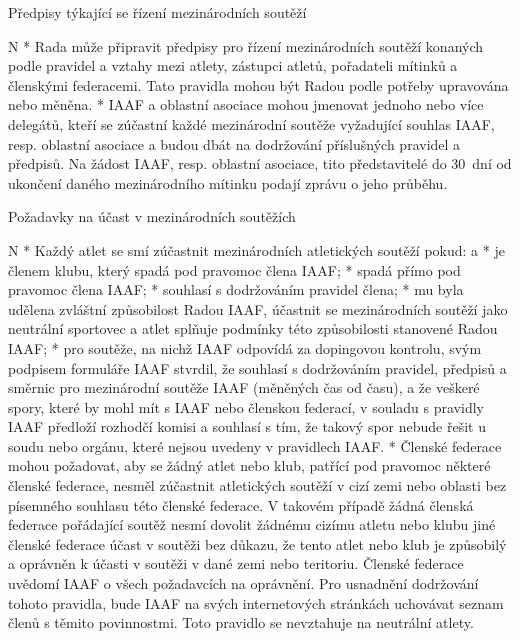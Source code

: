 \secc Předpisy týkající se řízení mezinárodních soutěží

\begitems \style N
* Rada může připravit předpisy pro řízení mezinárodních soutěží konaných podle pravidel a vztahy mezi atlety, zástupci atletů, pořadateli mítinků a členskými federacemi. Tato pravidla mohou být Radou podle potřeby upravována nebo měněna.
* IAAF a oblastní asociace mohou jmenovat jednoho nebo více delegátů, kteří se zúčastní každé mezinárodní soutěže vyžadující souhlas IAAF, resp. oblastní asociace a budou dbát na dodržování příslušných pravidel a předpisů. Na žádost IAAF, resp. oblastní asociace, tito představitelé do 30~dní od ukončení daného mezinárodního mítinku podají zprávu o jeho průběhu.
\enditems

\secc Požadavky na účast v mezinárodních soutěžích

\begitems \style N
* Každý atlet se smí zúčastnit mezinárodních atletických soutěží pokud:
  \begitems \style a
  * je členem klubu, který spadá pod pravomoc člena IAAF;
  * spadá přímo pod pravomoc člena IAAF;
  * souhlasí s dodržováním pravidel člena;
  * mu byla udělena zvláštní způsobilost Radou IAAF, účastnit  se mezinárodních soutěží jako neutrální sportovec a atlet splňuje podmínky této způsobilosti stanovené Radou IAAF;
  * pro soutěže, na nichž IAAF odpovídá za dopingovou kontrolu, svým podpisem formuláře IAAF stvrdil, že souhlasí s dodržováním pravidel, předpisů a směrnic pro mezinárodní soutěže IAAF (měněných čas od času), a že veškeré spory, které by mohl mít s IAAF nebo členskou federací, v souladu s pravidly IAAF předloží rozhodčí komisi a souhlasí s tím, že takový spor nebude řešit u soudu nebo orgánu, které nejsou uvedeny v pravidlech IAAF.
  \enditems
* Členské federace mohou požadovat, aby se žádný atlet nebo klub, patřící pod pravomoc některé členské federace, nesměl zúčastnit atletických soutěží v cizí zemi nebo oblasti bez písemného souhlasu této členské federace. V takovém případě žádná členská federace pořádající soutěž nesmí dovolit žádnému cizímu atletu nebo klubu jiné členské federace účast v soutěži bez důkazu, že tento atlet nebo klub je způsobilý a oprávněn k účasti v soutěži v dané zemi nebo teritoriu. Členské federace uvědomí IAAF o všech požadavcích na oprávnění. Pro usnadnění dodržování tohoto pravidla, bude IAAF na svých internetových stránkách uchovávat seznam členů s těmito povinnostmi. Toto pravidlo se nevztahuje na neutrální atlety.
